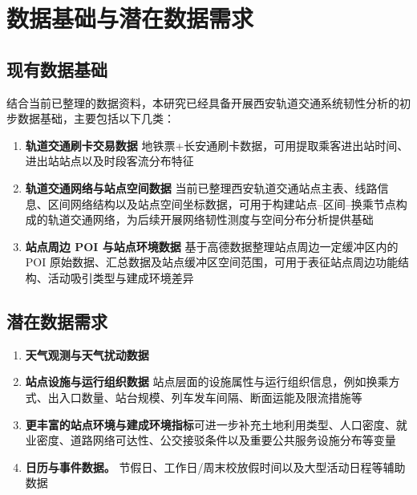 \section{数据基础与潜在数据需求}

\subsection{现有数据基础}

结合当前已整理的数据资料，本研究已经具备开展西安轨道交通系统韧性分析的初步数据基础，主要包括以下几类：

\begin{enumerate}
\item \textbf{轨道交通刷卡交易数据} 地铁票+长安通刷卡数据，可用提取乘客进出站时间、进出站站点以及时段客流分布特征
\item \textbf{轨道交通网络与站点空间数据} 当前已整理西安轨道交通站点主表、线路信息、区间网络结构以及站点空间坐标数据，可用于构建站点--区间--换乘节点构成的轨道交通网络，为后续开展网络韧性测度与空间分布分析提供基础
\item \textbf{站点周边 POI 与站点环境数据} 基于高德数据整理站点周边一定缓冲区内的 POI 原始数据、汇总数据及站点缓冲区空间范围，可用于表征站点周边功能结构、活动吸引类型与建成环境差异
\end{enumerate}


\subsection{潜在数据需求}

\begin{enumerate}
\item \textbf{天气观测与天气扰动数据} 
\item \textbf{站点设施与运行组织数据} 站点层面的设施属性与运行组织信息，例如换乘方式、出入口数量、站台规模、列车发车间隔、断面运能及限流措施等
\item \textbf{更丰富的站点环境与建成环境指标}可进一步补充土地利用类型、人口密度、就业密度、道路网络可达性、公交接驳条件以及重要公共服务设施分布等变量
\item \textbf{日历与事件数据。} 节假日、工作日/周末校放假时间以及大型活动日程等辅助数据
\end{enumerate}


